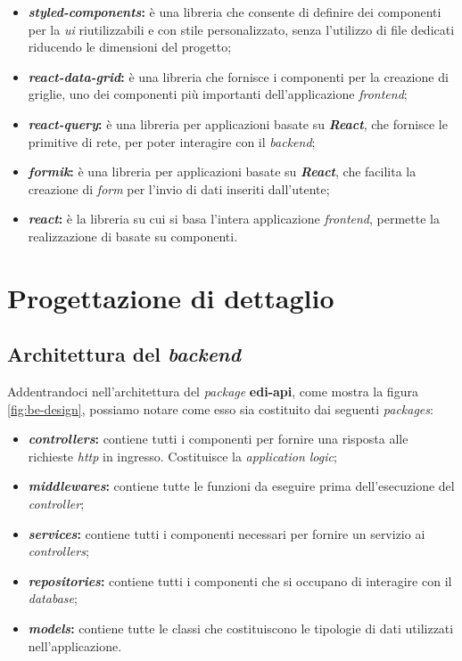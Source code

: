 \begin{itemize}
\begin{itemize}
      \item \textbf{\emph{styled-components}:} è una libreria che consente di definire dei componenti per la \emph{\gls{ui}} riutilizzabili e con stile personalizzato, senza l'utilizzo di file dedicati riducendo le dimensioni del progetto;
      \item \textbf{\emph{react-data-grid}:} è una libreria che fornisce i componenti per la creazione di griglie, uno dei componenti più importanti dell'applicazione \emph{\gls{frontend}};
      \item \textbf{\emph{react-query}:} è una libreria per applicazioni basate su \emph{\textbf{React}}, che fornisce le primitive di rete, per poter interagire con il \emph{\gls{backend}};
      \item \textbf{\emph{formik}:} è una libreria per applicazioni basate su \emph{\textbf{React}}, che facilita la creazione di \emph{form} per l'invio di dati inseriti dall'utente;
      \item \textbf{\emph{react}:} è la libreria su cui si basa l'intera applicazione \emph{\gls{frontend}}, permette la realizzazione di \emph{} basate su componenti.
    \end{itemize}
\end{itemize} 

\section{Progettazione di dettaglio}

\subsection{Architettura del \emph{\gls{backend}}}
Addentrandoci nell'architettura del \emph{package} \textbf{edi-api}, come mostra la figura \ref{fig:be-design}, possiamo notare come esso sia costituito dai seguenti \emph{packages}:
\begin{itemize}
  \item \textbf{\emph{controllers}:} contiene tutti i componenti per fornire una risposta alle richieste \emph{\acrshort{http}} in ingresso. Costituisce la \emph{application logic};
  \item \textbf{\emph{middlewares}:} contiene tutte le funzioni da eseguire prima dell'esecuzione del \emph{controller};
  \item \textbf{\emph{services}:} contiene tutti i componenti necessari per fornire un servizio ai \emph{controllers};
  \item \textbf{\emph{repositories}:} contiene tutti i componenti che si occupano di interagire con il \emph{database};
  \item \textbf{\emph{models}:} contiene tutte le classi che costituiscono le tipologie di dati utilizzati nell'applicazione.
\end{itemize}

